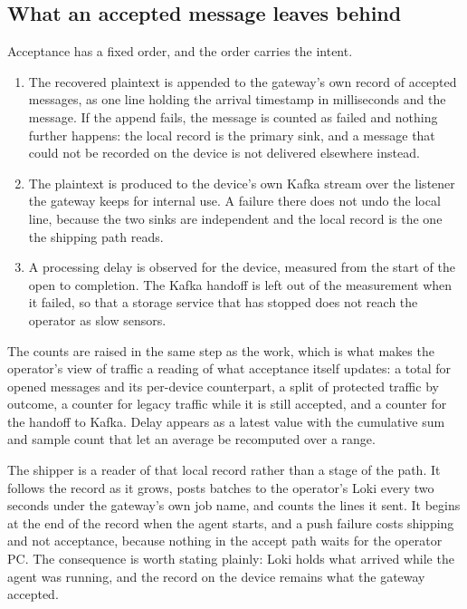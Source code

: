 \documentclass[12pt,a4paper]{report}
\begin{document}
\subsection{What an accepted message leaves behind}
\label{sec:gw-accept}

Acceptance has a fixed order, and the order carries the intent.

\begin{enumerate}
    \item The recovered plaintext is appended to the gateway's own
    record of accepted messages, as one line holding the arrival
    timestamp in milliseconds and the message. If the append fails,
    the message is counted as failed and nothing further happens:
    the local record is the primary sink, and a message that could
    not be recorded on the device is not delivered elsewhere
    instead.
    \item The plaintext is produced to the device's own Kafka stream
    over the listener the gateway keeps for internal use. A failure
    there does not undo the local line, because the two sinks are
    independent and the local record is the one the shipping path
    reads.
    \item A processing delay is observed for the device, measured
    from the start of the open to completion. The Kafka handoff is
    left out of the measurement when it failed, so that a storage
    service that has stopped does not reach the operator as slow
    sensors.
\end{enumerate}

The counts are raised in the same step as the work, which is what
makes the operator's view of traffic a reading of what acceptance
itself updates: a total for opened messages and its per-device
counterpart, a split of protected traffic by outcome, a counter for
legacy traffic while it is still accepted, and a counter for the
handoff to Kafka. Delay appears as a latest value with the
cumulative sum and sample count that let an average be recomputed
over a range.

The shipper is a reader of that local record rather than a stage of
the path. It follows the record as it grows, posts batches to the
operator's Loki every two seconds under the gateway's own job name,
and counts the lines it sent. It begins at the end of the record
when the agent starts, and a push failure costs shipping and not
acceptance, because nothing in the accept path waits for the
operator PC. The consequence is worth stating plainly: Loki holds
what arrived while the agent was running, and the record on the
device remains what the gateway accepted.
\end{document}
